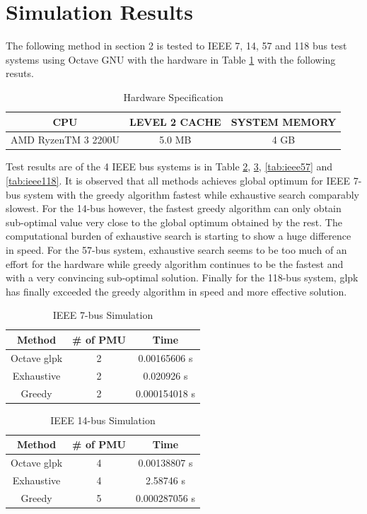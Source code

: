 \documentclass[conference]{IEEEtran}
\begin{document}
\section{Simulation Results}
The following method in section 2 is tested to IEEE 7, 14, 57 and 118 bus test systems using Octave GNU with the hardware in Table \ref{tab:hardware} with the following resuts.

\begin{table}[htbp]
	\centering
	\caption{Hardware Specification}
	\label{tab:hardware}
	\begin{tabular}{@{}ccc@{}}
		\toprule
		CPU                 & LEVEL 2 CACHE & SYSTEM MEMORY \\ \midrule
		AMD RyzenTM 3 2200U & 5.0 MB        & 4 GB          \\ \bottomrule
	\end{tabular}
\end{table}

Test results are of the 4 IEEE bus systems is in Table \ref{tab:ieee7}, \ref{tab:ieee14}, \ref{tab:ieee57} and \ref{tab:ieee118}. It is observed that all methods achieves global optimum for IEEE 7-bus system with the greedy algorithm fastest while exhaustive search comparably slowest. For the 14-bus however, the fastest greedy algorithm can only obtain sub-optimal value very close to the global optimum obtained by the rest. The computational burden of exhaustive search is starting to show a huge difference in speed. For the 57-bus system, exhaustive search seems to be too much of an effort for the hardware while greedy algorithm continues to be the fastest and with a very convincing sub-optimal solution. Finally for the 118-bus system, glpk has finally exceeded the greedy algorithm in speed and more effective solution.

\begin{table}[htbp]
	\centering
	\caption{IEEE 7-bus Simulation}
	\label{tab:ieee7}
	\begin{tabular}{@{}|c|c|c|@{}}
		\toprule
		Method      & \# of PMU & Time         \\ \midrule
		Octave glpk & 2         & 0.00165606 s  \\ \midrule
		Exhaustive  & 2         & 0.020926 s    \\ \midrule
		Greedy      & 2         & 0.000154018 s \\ \bottomrule
	\end{tabular}
\end{table}

\begin{table}[htbp]
	\centering
	\caption{IEEE 14-bus Simulation}
	\label{tab:ieee14}
	\begin{tabular}{@{}|c|c|c|@{}}
		\toprule
		Method      & \# of PMU & Time        \\ \midrule
		Octave glpk & 4         & 0.00138807 s \\ \midrule
		Exhaustive  & 4         & 2.58746 s     \\ \midrule
		Greedy      & 5         & 0.000287056 s \\ \bottomrule
	\end{tabular}
\end{table}
\end{document}
